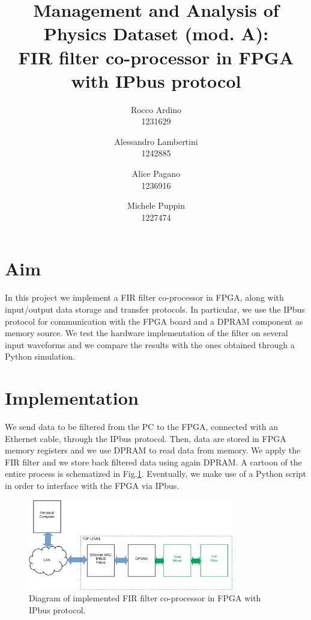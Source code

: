 \documentclass[11pt, a4paper]{article}
\begin{document}
\author{Rocco Ardino\\1231629  \and Alessandro Lambertini\\ 1242885 \and Alice Pagano \\1236916 \and Michele Puppin \\ 1227474}
\title{\textbf{Management and Analysis of Physics Dataset (mod. A): \\ FIR filter co-processor in FPGA with IPbus protocol}}
\maketitle

\section{Aim}
In this project we implement a FIR filter co-processor in FPGA, along with input/output data storage and transfer protocols. In particular, we use the IPbus protocol for communication with the FPGA board and a DPRAM component as memory source. We test the hardware implementation of the filter on several input waveforms and we compare the results with the ones obtained through a Python simulation.





\section{Implementation}
We send data to be filtered from the PC to the FPGA, connected with an Ethernet cable, through the IPbus protocol. Then, data are stored in FPGA memory registers and we use DPRAM to read data from memory. We apply the FIR filter and we store back filtered data using again DPRAM. A cartoon of the entire process is schematized in Fig.\ref{fig:first_diagram}. Eventually, we make use of a Python script in order to interface with the FPGA via IPbus.

\vspace{1cm}
\begin{figure}[h!]
    \centering
    \includegraphics[width=0.8\textwidth]{../images/implementation/diagram.pdf}
    \caption{\label{fig:first_diagram} Diagram of implemented FIR filter co-processor in FPGA with IPbus protocol.}
\end{figure}
\vspace{1cm}
\end{document}

